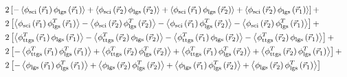 \begin{equation}
\begin{aligned}
\\ & 
2\left[-\left\langle\phi_{\rm sci}\left(\vec{r}_{1}\right) \phi_{\rm lgs}\left(\vec{r}_{1}\right)\right\rangle + 
\left\langle\phi_{\rm sci}\left(\vec{r}_{2}\right) \phi_{\rm lgs}\left(\vec{r}_{2}\right)\right\rangle +
\left\langle\phi_{\rm sci}\left(\vec{r}_{1}\right) \phi_{\rm lgs}\left(\vec{r}_{2}\right)\right\rangle +
\left\langle\phi_{\rm sci}\left(\vec{r}_{2}\right) \phi_{\rm lgs}\left(\vec{r}_{1}\right)\right\rangle\right] +
\\ & 
2\left[\left\langle\phi_{\rm sci}\left(\vec{r}_{1}\right) \phi^{T}_{\rm lgs}\left(\vec{r}_{1}\right)\right\rangle -
\left\langle\phi_{\rm sci}\left(\vec{r}_{2}\right) \phi^{T}_{\rm lgs}\left(\vec{r}_{2}\right)\right\rangle -
\left\langle\phi_{\rm sci}\left(\vec{r}_{1}\right) \phi^{T}_{\rm lgs}\left(\vec{r}_{2}\right)\right\rangle -
\left\langle\phi_{\rm sci}\left(\vec{r}_{2}\right) \phi^{T}_{\rm lgs}\left(\vec{r}_{1}\right)\right\rangle\right] + 
\\ & 
2\left[\left\langle\phi^{T}_{\rm ttgs}\left(\vec{r}_{1}\right) \phi_{\rm lgs}\left(\vec{r}_{1}\right)\right\rangle - 
\left\langle\phi^{T}_{\rm ttgs}\left(\vec{r}_{2}\right) \phi_{\rm lgs}\left(\vec{r}_{2}\right)\right\rangle -
\left\langle\phi^{T}_{\rm ttgs}\left(\vec{r}_{1}\right) \phi_{\rm lgs}\left(\vec{r}_{2}\right)\right\rangle -
\left\langle\phi^{T}_{\rm ttgs}\left(\vec{r}_{2}\right) \phi_{\rm lgs}\left(\vec{r}_{1}\right)\right\rangle\right] + 
\\ & 
2\left[-\left\langle\phi^{T}_{\rm ttgs}\left(\vec{r}_{1}\right) \phi^{T}_{\rm lgs}\left(\vec{r}_{1}\right)\right\rangle + 
\left\langle\phi^{T}_{\rm ttgs}\left(\vec{r}_{2}\right) \phi^{T}_{\rm lgs}\left(\vec{r}_{2}\right)\right\rangle +
\left\langle\phi^{T}_{\rm ttgs}\left(\vec{r}_{1}\right) \phi^{T}_{\rm lgs}\left(\vec{r}_{2}\right)\right\rangle +
\left\langle\phi^{T}_{\rm ttgs}\left(\vec{r}_{2}\right) \phi^{T}_{\rm lgs}\left(\vec{r}_{1}\right)\right\rangle\right] +
\\ & 
2\left[-\left\langle\phi_{\rm lgs}\left(\vec{r}_{1}\right) \phi^{T}_{\rm lgs}\left(\vec{r}_{1}\right)\right\rangle + 
\left\langle\phi_{\rm lgs}\left(\vec{r}_{2}\right) \phi^{T}_{\rm lgs}\left(\vec{r}_{2}\right)\right\rangle +
\left\langle\phi_{\rm lgs}\left(\vec{r}_{1}\right) \phi^{T}_{\rm lgs}\left(\vec{r}_{2}\right)\right\rangle +
\left\langle\phi_{\rm lgs}\left(\vec{r}_{2}\right) \phi^{T}_{\rm lgs}\left(\vec{r}_{1}\right)\right\rangle\right]
\end{aligned}
\end{equation}
